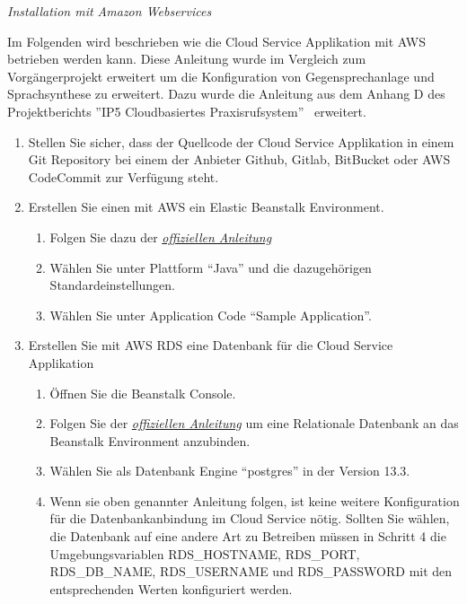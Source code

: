 \textit{Installation mit Amazon Webservices}

Im Folgenden wird beschrieben wie die Cloud Service Applikation mit AWS betrieben werden kann.
Diese Anleitung wurde im Vergleich zum Vorgängerprojekt erweitert um die Konfiguration von Gegensprechanlage und Sprachsynthese zu erweitert.
Dazu wurde die Anleitung aus dem Anhang D des Projektberichts ''IP5 Cloudbasiertes Praxisrufsystem''~\cite{ip5} erweitert.

\begin{enumerate}
    \item Stellen Sie sicher, dass der Quellcode der Cloud Service Applikation in einem Git Repository bei einem der Anbieter Github, Gitlab, BitBucket oder AWS CodeCommit zur Verfügung steht.
    \item Erstellen Sie einen mit AWS ein Elastic Beanstalk Environment.
    \begin{enumerate}
        \item Folgen Sie dazu der \href{https://docs.aws.amazon.com/elasticbeanstalk/latest/dg/GettingStarted.CreateApp.html}{\textit{offiziellen Anleitung}}\cite{aws-elastic}
        \item Wählen Sie unter Plattform ``Java'' und die dazugehörigen Standardeinstellungen.
        \item Wählen Sie unter Application Code ``Sample Application''.
    \end{enumerate}
    \item Erstellen Sie mit AWS RDS eine Datenbank für die Cloud Service Applikation
    \begin{enumerate}
        \item Öffnen Sie die Beanstalk Console.
        \item Folgen Sie der \href{https://docs.aws.amazon.com/elasticbeanstalk/latest/dg/using-features.managing.db.html}{\textit{offiziellen Anleitung}}\cite{aws-elastic-rds} um eine Relationale Datenbank an das Beanstalk Environment anzubinden.
        \item Wählen Sie als Datenbank Engine ``postgres'' in der Version 13.3.
        \item Wenn sie oben genannter Anleitung folgen, ist keine weitere Konfiguration für die Datenbankanbindung im Cloud Service nötig.
        Sollten Sie wählen, die Datenbank auf eine andere Art zu Betreiben müssen in Schritt 4 die Umgebungsvariablen RDS\_HOSTNAME, RDS\_PORT, RDS\_DB\_NAME, RDS\_USERNAME und RDS\_PASSWORD mit den entsprechenden Werten konfiguriert werden.
    \end{enumerate}

\end{enumerate}
